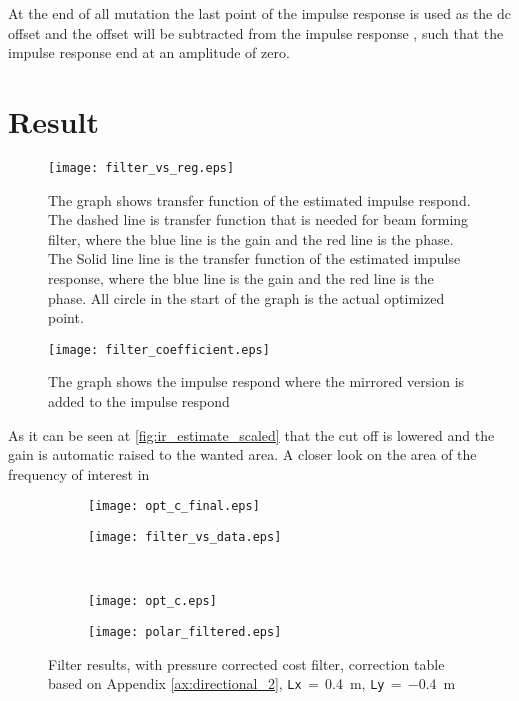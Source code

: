 At the end of all mutation the last point of the impulse response is used as the \gls{dc} offset and the offset will be subtracted from the impulse response , such that the impulse response end at an amplitude of zero. 

\section{Result}


 

\begin{figure}[H]
	\centering
	\texttt{[image: filter\_vs\_reg.eps]}
	\caption{The graph shows transfer function of the estimated impulse respond. The dashed line is transfer function that is needed for beam forming filter, where the blue line is the gain and the red line is the phase. The Solid line line is the transfer function of the estimated impulse response, where the blue line is the gain and the red line is the phase. All circle in the start of the graph is the actual optimized point.}
		\label{fig:filter_vs_reg}
\end{figure}

\begin{figure}[H]
	\centering
	\texttt{[image: filter\_coefficient.eps]}
	\caption{The graph shows the impulse respond where the mirrored version is added to the impulse respond}
		\label{fig:filter_coefficient}
\end{figure}

As it can be seen at \autoref{fig:ir_estimate_scaled} that the cut off is lowered and the gain is automatic raised to the wanted area. A closer look on the area of the frequency of interest in 


\begin{figure}[H]
\begin{subfigure}[c]{0.5\textwidth}
\texttt{[image: opt\_c\_final.eps]}
\label{fig:opt_res_a_finish}
\end{subfigure}
\begin{subfigure}[c]{0.5\textwidth}
\texttt{[image: filter\_vs\_data.eps]}
\label{fig:filter_vs_data_finish}
\end{subfigure}\\
\hspace{0.1\textheight}
\begin{subfigure}[c]{0.5\textwidth}
\texttt{[image: opt\_c.eps]}
\label{fig:opt_res_c_finish}
\end{subfigure}
\begin{subfigure}[c]{0.5\textwidth}
\texttt{[image: polar\_filtered.eps]}
\label{fig:polar_filtered_finish}
\end{subfigure}
\caption{Filter results, with pressure corrected cost filter, correction table based on Appendix \ref{ax:directional_2}, \textcolor{green3}{\texttt{Lx}}\,$=$\,\SI{0.4}{\meter}, \textcolor{green3}{\texttt{Ly}}\,$=\,$\SI{-0.4}{\meter}}
		\label{fig:opt_res_finish}
\end{figure}


